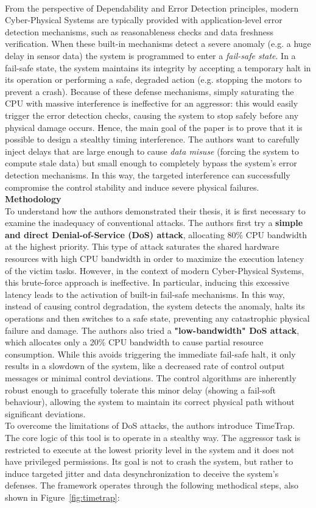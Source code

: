 \\
From the perspective of Dependability and Error Detection principles, modern Cyber-Physical Systems are typically provided with application-level error detection mechanisms, such as reasonableness checks and data freshness verification. When these built-in mechanisms detect a severe anomaly (e.g. a huge delay in sensor data) the system is programmed to enter a \textit{fail-safe state}. In a fail-safe state, the system maintains its integrity by accepting a temporary halt in its operation or performing a safe, degraded action (e.g. stopping the motors to prevent a crash).
Because of these defense mechanisms, simply saturating the CPU with massive interference is ineffective for an aggressor: this would easily trigger the error detection checks, causing the system to stop safely before any physical damage occurs. 
Hence, the main goal of the paper is to prove that it is possible to design a stealthy timing interference. The authors want to carefully inject delays that are large enough to cause \textit{data misuse} (forcing the system to compute stale data) but small enough to completely bypass the system's error detection mechanisms. In this way, the targeted interference can successfully compromise the control stability and induce severe physical failures.
\\
\textbf{Methodology} \\
To understand how the authors demonstrated their thesis, it is first necessary to examine the inadequacy of conventional attacks. The authors first try a \textbf{simple and direct Denial-of-Service (DoS) attack}, allocating 80\% CPU bandwidth at the highest priority. This type of attack saturates the shared hardware resources with high CPU bandwidth in order to maximize the execution latency of the victim tasks. However, in the context of modern Cyber-Physical Systems, this brute-force approach is ineffective. In particular, inducing this excessive latency leads to the activation of built-in fail-safe mechanisms. In this way, instead of causing control degradation, the system detects the anomaly, halts its operations and then switches to a safe state, preventing any catastrophic physical failure and damage.
The authors also tried a \textbf{"low-bandwidth" DoS attack}, which allocates only a 20\% CPU bandwidth to cause partial resource consumption. While this avoids triggering the immediate fail-safe halt, it only results in a slowdown of the system, like a decreased rate of control output messages or minimal control deviations. The control algorithms are inherently robust enough to gracefully tolerate this minor delay (showing a fail-soft behaviour), allowing the system to maintain its correct physical path without significant deviations.
\\
To overcome the limitations of DoS attacks, the authors introduce TimeTrap. The core logic of this tool is to operate in a stealthy way. The aggressor task is restricted to execute at the lowest priority level in the system and it does not have privileged permissions. Its goal is not to crash the system, but rather to induce targeted jitter and data desynchronization to deceive the system's defenses. The framework operates through the following methodical steps, also shown in Figure~\ref{fig:timetrap}:

